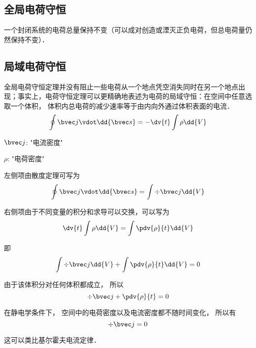 
\subsection{全局电荷守恒}
一个封闭系统的电荷总量保持不变\cite{GriffE}（可以成对创造或湮灭正负电荷，但总电荷量仍然保持不变）．

\subsection{局域电荷守恒}
全局电荷守恒定理并没有阻止一些电荷从一个地点凭空消失同时在另一个地点出现；事实上，电荷守恒定理可以更精确地表述为电荷的局域守恒：在空间中任意选取一个体积， 体积内总电荷的减少速率等于由内向外通过体积表面的电流．\cite{GriffE}
\begin{equation}
\oint \bvec j \vdot \dd{\bvec s}  =  - \dv{t} \int \rho \dd{V}
\end{equation} 

$\bvec j$: "电流密度"

$\rho$: "电荷密度"

左侧项由散度定理可写为
\begin{equation}
\oint \bvec j \vdot \dd{\bvec s}  =\int \div \bvec j \dd{V}
\end{equation} 

右侧项由于不同变量的积分和求导可以交换，可以写为%
\begin{equation}
\dv{t} \int \rho  \dd{V}  = \int \pdv{\rho}{t} \dd{V}
\end{equation}

即
\begin{equation}
\int \div \bvec j \dd{V} + \int \pdv{\rho}{t} \dd{V} = 0
\end{equation} 

由于该体积分对任何体积都成立， 所以
\begin{equation}\label{ChgCsv_eq4}
\div \bvec j + \pdv{\rho}{t} = 0
\end{equation}

在静电学条件下， 空间中的电荷密度以及电流密度都不随时间变化， 所以有
\begin{equation}
\div \bvec j = 0
\end{equation}

这可以类比基尔霍夫电流定律．
